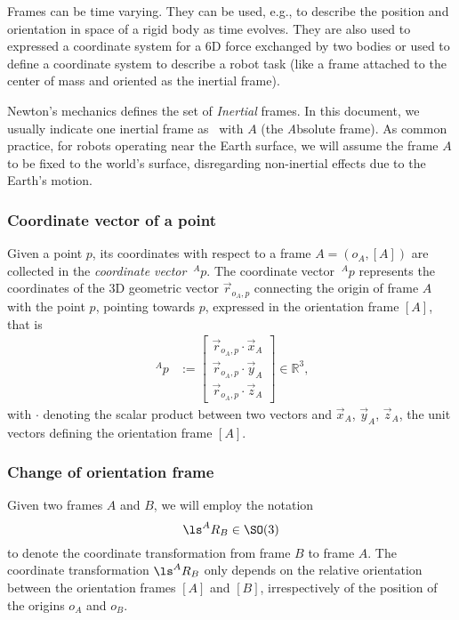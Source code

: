 Frames can be time varying. They can be used, e.g., to describe the position and orientation in space of a rigid body as time evolves.
They are also used to expressed a coordinate system for a 6D force exchanged by two bodies
or used to define a coordinate system
to describe a robot task (like a frame attached to the center of mass and oriented as the inertial frame). 

Newton's mechanics defines the set of \emph{Inertial} frames. In this document, we usually indicate one inertial frame as \ with $A$ (the \emph{A}bsolute frame). As common practice, for robots operating near the Earth surface, we will assume the frame $A$ to be fixed to the world's surface, disregarding non-inertial effects due to the Earth's motion.

\subsubsection{Coordinate vector of a point}
Given a point $p$, its coordinates with respect to a frame $A = (o_A, [A])$ are collected in the {\em coordinate vector} ${~\!\!}^A p$. The coordinate vector ${~\!\!}^A p$ represents the coordinates of the 3D geometric vector ${\overset{\rightarrow}{r}}_{o_A,p}$ connecting the origin of frame $A$ with the point $p$, pointing towards $p$, expressed in the orientation frame $[A]$,
that is
\begin{align}
  ~^A p 
& := 
  \begin{bmatrix}
  {\overset{\rightarrow}{r}}_{o_A,p} 
  \cdot 
  {\overset{\rightarrow}{x}}_A \\
  {\overset{\rightarrow}{r}}_{o_A,p} 
  \cdot 
  {\overset{\rightarrow}{y}}_A \\
  {\overset{\rightarrow}{r}}_{o_A,p} 
  \cdot 
  {\overset{\rightarrow}{z}}_A
  \end{bmatrix}
\in \mathbb{R}^3,
\end{align}
with $\cdot$ denoting the scalar product
between two vectors and
${\overset{\rightarrow}{x}}_A$,
${\overset{\rightarrow}{y}}_A$,
${\overset{\rightarrow}{z}}_A$,
the unit vectors defining
the orientation frame $[A]$.

\subsubsection{Change of orientation frame}
Given two frames $A$ and $B$, we will employ the notation
\begin{equation}
  \ls^{A} R_{B} \in \SO(3) 
\end{equation}
to denote the coordinate transformation from frame $B$ to frame $A$. 
The coordinate transformation $\ls^A R_B$ only depends on the
relative orientation between the orientation frames $[A]$ and $[B]$,
irrespectively of the position of the origins $o_A$ and $o_B$. 

